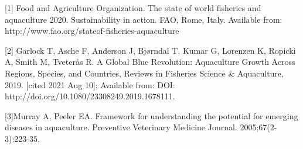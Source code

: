 \documentclass[]{elsarticle} %
\begin{document}
{[}1{]} Food and Agriculture Organization. The state of world fisheries and aquaculture 2020. Sustainability in action. FAO, Rome, Italy. Available from: http://www.fao.org/stateof-fisheries-aquaculture

{[}2{]} Garlock T, Asche F, Anderson J, Bjørndal T, Kumar G, Lorenzen K, Ropicki A, Smith M, Tveterås R. A Global Blue Revolution: Aquaculture Growth Across Regions, Species, and Countries, Reviews in Fisheries Science \& Aquaculture, 2019. {[}cited 2021 Aug 10{]}; Available from: DOI:\\
http://doi.org/10.1080/23308249.2019.1678111.

{[}3{]}Murray A, Peeler EA. Framework for understanding the potential for emerging diseases in aquaculture. Preventive Veterinary Medicine Journal. 2005;67(2-3):223-35.
\end{document}
